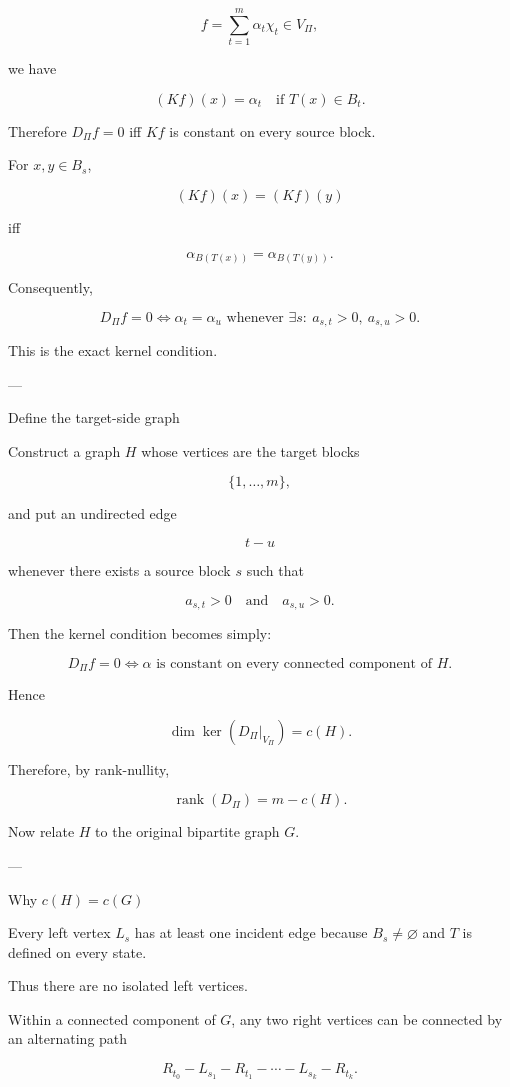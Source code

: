 \[
f=\sum_{t=1}^m\alpha_t\chi_t\in V_\Pi,  
\]

we have

\[
(Kf)(x)=\alpha_t  
\quad\text{if }T(x)\in B_t.  
\]

Therefore \(D_\Pi f=0\) iff \(Kf\) is constant on every source block.

For \(x,y\in B_s\),

\[
(Kf)(x)=(Kf)(y)  
\]

iff

\[
\alpha_{B(T(x))}  
=  
\alpha_{B(T(y))}.  
\]

Consequently,

\[
\boxed{  
D_\Pi f=0  
\iff  
\alpha_t=\alpha_u  
\text{ whenever }  
\exists s:\ a_{s,t}>0,\ a_{s,u}>0.  
}  
\]

This is the exact kernel condition.


---

Define the target-side graph

Construct a graph \(H\) whose vertices are the target blocks

\[
\{1,\ldots,m\},  
\]

and put an undirected edge

\[
t-u  
\]

whenever there exists a source block \(s\) such that

\[
a_{s,t}>0  
\quad\text{and}\quad  
a_{s,u}>0.  
\]

Then the kernel condition becomes simply:

\[
D_\Pi f=0  
\iff  
\alpha  
\text{ is constant on every connected component of }H.  
\]

Hence

\[
\boxed{  
\dim\ker(D_\Pi|_{V_\Pi})  
=c(H).  
}  
\]

Therefore, by rank-nullity,

\[
\operatorname{rank}(D_\Pi)  
=  
m-c(H).  
\]

Now relate \(H\) to the original bipartite graph \(G\).


---

Why \(c(H)=c(G)\)

Every left vertex \(L_s\) has at least one incident edge because \(B_s\neq\varnothing\) and \(T\) is defined on every state.

Thus there are no isolated left vertices.

Within a connected component of \(G\), any two right vertices can be connected by an alternating path

\[
R_{t_0}-L_{s_1}-R_{t_1}-\cdots-L_{s_k}-R_{t_k}.  
\]

